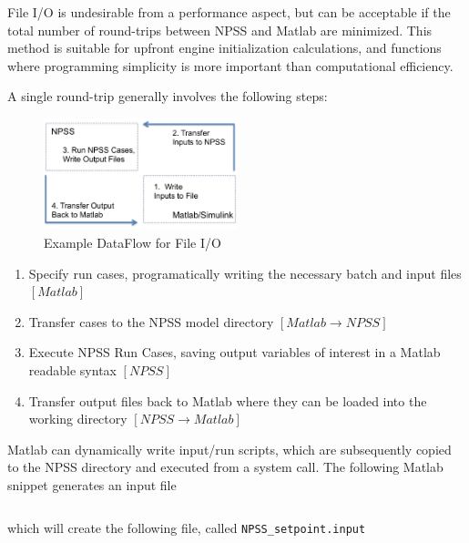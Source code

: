 \documentclass[heading.tex]{subfiles}
\begin{document}
File I/O is undesirable from a performance aspect, but can be acceptable if the total number of round-trips between
NPSS and Matlab are minimized. This method is suitable for upfront engine initialization calculations, 
and functions where programming simplicity is more important than computational efficiency.

A single round-trip generally involves the following steps:

\begin{figure}[H]
\centering
\includegraphics[width=0.5\textwidth]{images/roundTrip}
\caption{Example DataFlow for File I/O}
\label{f:DialogBox}
\end{figure}

\begin{enumerate}
  \item Specify run cases, programatically writing the necessary batch and input files $[Matlab]$
  \item Transfer cases to the NPSS model directory $[Matlab \rightarrow NPSS]$
  \item Execute NPSS Run Cases, saving output variables of interest in a Matlab readable syntax $[NPSS]$
  \item Transfer output files back to Matlab where they can be loaded into the working directory $[NPSS \rightarrow Matlab]$
\end{enumerate}


Matlab can dynamically write input/run scripts, which are subsequently
copied to the NPSS directory and executed from a system call.
The following Matlab snippet generates an input file

 \begin{adjustwidth}{-1cm}{-1cm}
 \inputminted[]{matlab}{code/dlmwrite.m}
 \end{adjustwidth} 

which will create the following file, called \texttt{NPSS\_setpoint.input}

 \begin{adjustwidth}{-1cm}{-1cm}
 \inputminted[]{matlab}{code/dlmOutput.m}
 \end{adjustwidth} 
\end{document}
